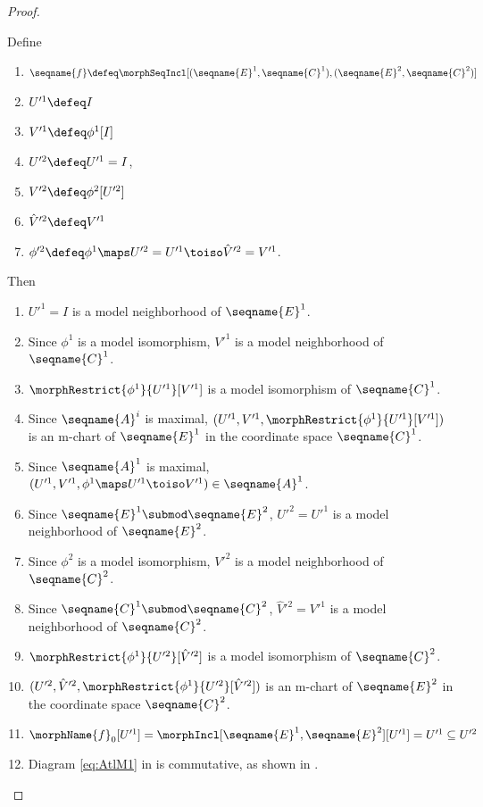 \documentclass{article}
\begin{document}
\begin{lemma}
\begin{proof}
\begin{description}
Define
\begin{enumerate}
\item
$
  \seqname{f} \defeq
  \morphSeqIncl%
    [
      {(\seqname{E}^1,\seqname{C}^1)},
      {(\seqname{E}^2,\seqname{C}^2)}
    ]
$
\item
$U'^1 \defeq I$
\item
$V'^1 \defeq \phi^1[I]$
\item
$U'^2 \defeq U'^1 = I$,
\item
$V'^2 \defeq \phi^2[U'^2]$
\item
$\hat{V}'^2 \defeq V'^1$
\item
$\phi'^2 \defeq \phi^1 \maps U'^2 = U'^1 \toiso \hat{V}'^2 = V'^1$.
\end{enumerate}

Then
\begin{enumerate}
\item
$U'^1 = I$ is a model neighborhood of $\seqname{E}^1$.
\item
Since $\phi^1$ is a model isomorphism, $V'^1$ is a model neighborhood of
$\seqname{C}^1$.
\item
$\morphRestrict{\phi^1}{U'^1}[V'^1]$ is a model isomorphism of $\seqname{C}^1$.
\item
Since $\seqname{A}^i$ is maximal,
$(U'^1,V'^1,\morphRestrict{\phi^1}{U'^1}[V'^1])$ is an m-chart of
$\seqname{E}^1$ in the coordinate space $\seqname{C}^1$.

\item
Since $\seqname{A}^1$ is maximal,
$(U'^1,V'^1, \phi^1 \maps U'^1 \toiso V'^1) \in \seqname{A}^1$.
\item
Since $\seqname{E}^1 \submod \seqname{E}^2$, $U'^2 = U'^1$ is a
model neighborhood of $\seqname{E}^2$.
\item
Since $\phi^2$ is a model isomorphism, $V'^2$ is a model neighborhood of
$\seqname{C}^2$.
\item
Since $\seqname{C}^1 \submod \seqname{C}^2$, $\hat{V}'^2 = V'^1$ is a
model neighborhood of $\seqname{C}^2$.
\item
$\morphRestrict{\phi^1}{U'^2}[\hat{V}'^2]$ is a model isomorphism of
$\seqname{C}^2$.
\item
$(U'^2,\hat{V}'^2,\morphRestrict{\phi^1}{U'^2}[\hat{V}'^2])$ is an m-chart
of $\seqname{E}^2$ in the coordinate space $\seqname{C}^2$.
\item
$
  \morphName{f}_0[U'^1] =
  \morphIncl[{\seqname{E}^1},{\seqname{E}^2}][U'^1] =
  U'^1 \subseteq U'^2
$
\item
Diagram \eqref{eq:AtlM1} in
{
  \showlabelsinline
}
is commutative, as shown in .
\end{enumerate}


\end{description}
\end{proof}
\end{lemma}
\end{document}
